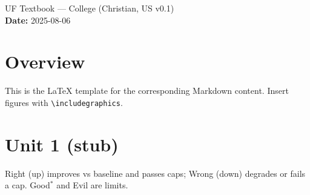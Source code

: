 \documentclass[11pt]{article}
\begin{document}
\begin{center}
{\LARGE UF Textbook — College (Christian, US v0.1) }\\[6pt]
\textbf{Date: }2025-08-06
\end{center}

\section*{Overview}
This is the LaTeX template for the corresponding Markdown content. Insert figures with \texttt{\textbackslash includegraphics}.

\section*{Unit 1 (stub)}
Right (up) improves vs baseline and passes caps; Wrong (down) degrades or fails a cap. Good$^\ast$ and Evil are limits.
\end{document}
